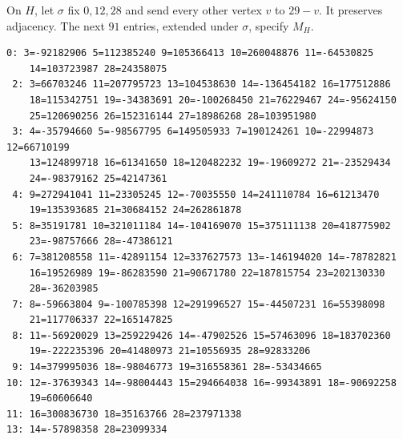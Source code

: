 On $H$, let $\sigma$ fix $0,12,28$ and send every other vertex
$v$ to $29-v$. It preserves adjacency. The next $91$ entries, extended
under $\sigma$, specify $M_H$.
\begin{Verbatim}[fontsize=\scriptsize,baselinestretch=1.03]
 0: 3=-92182906 5=112385240 9=105366413 10=260048876 11=-64530825
    14=103723987 28=24358075
 2: 3=66703246 11=207795723 13=104538630 14=-136454182 16=177512886
    18=115342751 19=-34383691 20=-100268450 21=76229467 24=-95624150
    25=120690256 26=152316144 27=18986268 28=103951980
 3: 4=-35794660 5=-98567795 6=149505933 7=190124261 10=-22994873 12=66710199
    13=124899718 16=61341650 18=120482232 19=-19609272 21=-23529434
    24=-98379162 25=42147361
 4: 9=272941041 11=23305245 12=-70035550 14=241110784 16=61213470
    19=135393685 21=30684152 24=262861878
 5: 8=35191781 10=321011184 14=-104169070 15=375111138 20=418775902
    23=-98757666 28=-47386121
 6: 7=381208558 11=-42891154 12=337627573 13=-146194020 14=-78782821
    16=19526989 19=-86283590 21=90671780 22=187815754 23=202130330
    28=-36203985
 7: 8=-59663804 9=-100785398 12=291996527 15=-44507231 16=55398098
    21=117706337 22=165147825
 8: 11=-56920029 13=259229426 14=-47902526 15=57463096 18=183702360
    19=-222235396 20=41480973 21=10556935 28=92833206
 9: 14=379995036 18=-98046773 19=316558361 28=-53434665
10: 12=-37639343 14=-98004443 15=294664038 16=-99343891 18=-90692258
    19=60606640
11: 16=300836730 18=35163766 28=237971338
13: 14=-57898358 28=23099334
\end{Verbatim}

